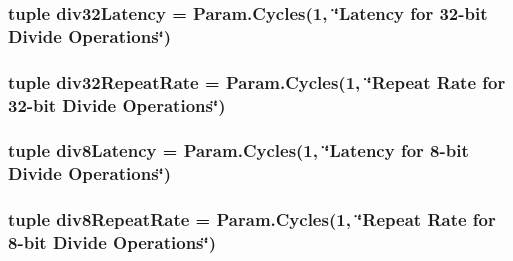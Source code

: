 \label{classInOrderCPU_1_1InOrderCPU_ab804bac6417fc4bbdbf4cee8466a689c}
\hypertarget{classInOrderCPU_1_1InOrderCPU_ab5c92c70e2ba81c832ffe484375fd29f}{
\subsubsection[{div32Latency}]{\setlength{\rightskip}{0pt plus 5cm}tuple {\bf div32Latency} = Param.Cycles(1, \char`\"{}Latency for 32-\/bit Divide Operations\char`\"{})}}
\label{classInOrderCPU_1_1InOrderCPU_ab5c92c70e2ba81c832ffe484375fd29f}
\hypertarget{classInOrderCPU_1_1InOrderCPU_a5dc41b764ba517eb08a9d7297e292748}{
\subsubsection[{div32RepeatRate}]{\setlength{\rightskip}{0pt plus 5cm}tuple {\bf div32RepeatRate} = Param.Cycles(1, \char`\"{}Repeat Rate for 32-\/bit Divide Operations\char`\"{})}}
\label{classInOrderCPU_1_1InOrderCPU_a5dc41b764ba517eb08a9d7297e292748}
\hypertarget{classInOrderCPU_1_1InOrderCPU_a833c322d9e4b4bef952d030a08320497}{
\subsubsection[{div8Latency}]{\setlength{\rightskip}{0pt plus 5cm}tuple {\bf div8Latency} = Param.Cycles(1, \char`\"{}Latency for 8-\/bit Divide Operations\char`\"{})}}
\label{classInOrderCPU_1_1InOrderCPU_a833c322d9e4b4bef952d030a08320497}
\hypertarget{classInOrderCPU_1_1InOrderCPU_a736a65eafa168f467a9a36e107b331e6}{
\subsubsection[{div8RepeatRate}]{\setlength{\rightskip}{0pt plus 5cm}tuple {\bf div8RepeatRate} = Param.Cycles(1, \char`\"{}Repeat Rate for 8-\/bit Divide Operations\char`\"{})}}
